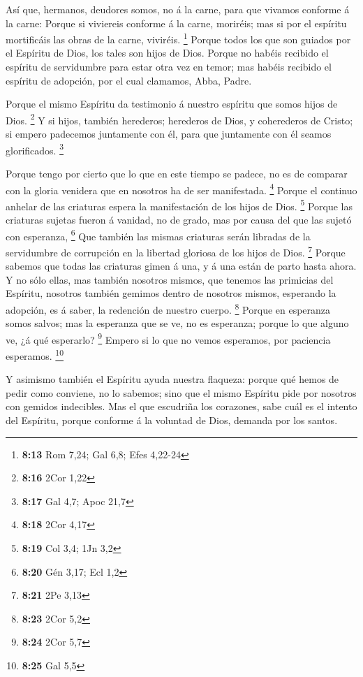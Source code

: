  Así que, hermanos, deudores somos, no á la carne, para que
vivamos conforme á la carne:  Porque si viviereis conforme
á la carne, moriréis; mas si por el espíritu mortificáis las obras de la
carne, viviréis. \footnote{\textbf{8:13} Rom 7,24; Gal 6,8; Efes 4,22-24}
 Porque todos los que son guiados por el Espíritu de Dios,
los tales son hijos de Dios.  Porque no habéis recibido el
espíritu de servidumbre para estar otra vez en temor; mas habéis
recibido el espíritu de adopción, por el cual clamamos, Abba, Padre.

 Porque el mismo Espíritu da testimonio á nuestro espíritu
que somos hijos de Dios. \footnote{\textbf{8:16} 2Cor 1,22}
 Y si hijos, también herederos; herederos de Dios, y
coherederos de Cristo; si empero padecemos juntamente con él, para que
juntamente con él seamos glorificados. \footnote{\textbf{8:17} Gal 4,7;
  Apoc 21,7}

 Porque tengo por cierto que lo que en este tiempo se
padece, no es de comparar con la gloria venidera que en nosotros ha de
ser manifestada. \footnote{\textbf{8:18} 2Cor 4,17}  Porque
el continuo anhelar de las criaturas espera la manifestación de los
hijos de Dios. \footnote{\textbf{8:19} Col 3,4; 1Jn 3,2} 
Porque las criaturas sujetas fueron á vanidad, no de grado, mas por
causa del que las sujetó con esperanza, \footnote{\textbf{8:20} Gén
  3,17; Ecl 1,2}  Que también las mismas criaturas serán
libradas de la servidumbre de corrupción en la libertad gloriosa de los
hijos de Dios. \footnote{\textbf{8:21} 2Pe 3,13}  Porque
sabemos que todas las criaturas gimen á una, y á una están de parto
hasta ahora.  Y no sólo ellas, mas también nosotros mismos,
que tenemos las primicias del Espíritu, nosotros también gemimos dentro
de nosotros mismos, esperando la adopción, es á saber, la redención de
nuestro cuerpo. \footnote{\textbf{8:23} 2Cor 5,2}  Porque
en esperanza somos salvos; mas la esperanza que se ve, no es esperanza;
porque lo que alguno ve, ¿á qué esperarlo? \footnote{\textbf{8:24} 2Cor
  5,7}  Empero si lo que no vemos esperamos, por paciencia
esperamos. \footnote{\textbf{8:25} Gal 5,5}

 Y asimismo también el Espíritu ayuda nuestra flaqueza:
porque qué hemos de pedir como conviene, no lo sabemos; sino que el
mismo Espíritu pide por nosotros con gemidos indecibles. 
Mas el que escudriña los corazones, sabe cuál es el intento del
Espíritu, porque conforme á la voluntad de Dios, demanda por los santos.

